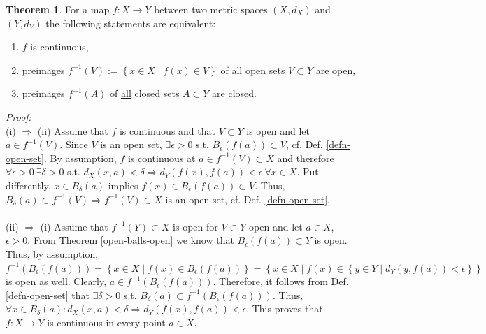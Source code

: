\documentclass[12pt, a4paper]{article}
\numberwithin{equation}{section}
\theoremstyle{definition}
\theoremstyle{definition}
\newtheorem{theorem}[thm]{Theorem}
\begin{document}
	\begin{theorem}\label{defn:preimages_continuous_functions}
		For a map $f: X\rightarrow Y$ between two metric spaces $\left(X, d_{X} \right)$ and $\left(Y, d_{Y} \right)$ the following statements are equivalent: 
		\begin{enumerate}[label = (\roman*)]
			\item $f$ is continuous,
			\item preimages $f^{-1}(V) := \left\{ x\in X\mid f\left(x\right) \in V \right\}$ of \underline{all} open sets $V\subset Y$ are open,  
			\item preimages $f^{-1}(A)$ of \underline{all} closed sets $A\subset Y$ are closed. 	
		\end{enumerate}
	\end{theorem} 
	\noindent\textit{Proof:} \\ (i) $\Rightarrow$ (ii) Assume that $f$ is continuous and that $V\subset Y$ is open and let $a\in f^{-1}\left( V\right)$. Since $V$ is an open set, $\exists \epsilon > 0$ s.t. $B_{\epsilon}\left( f\left(a\right) \right)\subset V$, cf. Def. \ref{defn-open-set}. By assumption, $f$ is continuous at $a\in f^{-1}\left(V\right)\subset X$ and therefore $\forall \epsilon > 0 \ \exists \delta > 0$ s.t. $d_{X}\left(x, a\right) < \delta\Rightarrow d_{Y}\left(f\left(x\right), f\left(a\right)\right) < \epsilon \ \forall x\in X$. Put differently, $x\in B_{\delta}\left( a\right)$ implies $f\left(x\right) \in B_{\epsilon}\left( f\left(a\right) \right) \subset V$. Thus, $B_{\delta}(a) \subset f^{-1}(V) \Rightarrow f^{-1}(V) \subset X$ is an open set, cf. Def. \ref{defn-open-set}. 
	\\ 
	\\ 
	(ii) $\Rightarrow$ (i) Assume that $f^{-1}\left(Y\right) \subset X$ is open for $V\subset Y$ open and let $a\in X$, $\epsilon > 0$. From Theorem \ref{open-balls-open} we know that $B_{\epsilon}\left(f\left(a\right)\right)\subset Y$ is open. Thus, by assumption, $f^{-1}\left( B_{\epsilon}\left( f\left(a\right) \right) \right) = \left\{ x\in X \mid f\left( x \right) \in B_{\epsilon}\left( f\left(a\right) \right) \right\} = \left\{ x\in X \mid f\left(x\right) \in \left\{ y\in Y\mid d_Y\left( y, f\left(a\right) \right) < \epsilon \right\}\right\}$ is open as well. Clearly, $a\in f^{-1}\left( B_{\epsilon}\left( f\left(a\right) \right) \right)$. Therefore, it follows from Def. \ref{defn-open-set} that $\exists\delta > 0$ s.t. $B_{\delta}(a) \subset f^{-1}\left( B_{\epsilon}\left( f\left(a\right) \right) \right)$. Thus, $\forall x\in B_{\delta}(a): d_{X}\left( x, a \right) < \delta \Rightarrow d_Y\left(f\left(x\right), f\left(a\right)\right) < \epsilon$. This proves that $f: X\rightarrow Y$ is continuous in every point $a\in X$. \cite{cont-functions-open-sets}   
\end{document}
